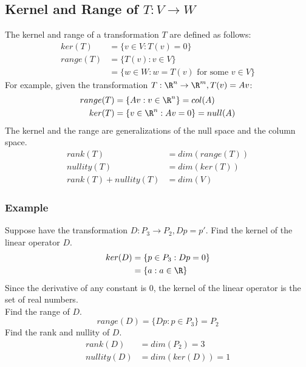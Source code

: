 \documentclass{math}
\begin{document}
\subsection*{Kernel and Range of \( T:V\to W \)}
The kernel and range of a transformation \( T \) are defined as follows:
\begin{align*}
  ker(T) &= \{v\in V: T(v) = 0\} \\
  range(T) &= \{T(v):v\in V\} \\
  &= \{w\in W: w = T(v)\text{ for some }v\in V\}
\end{align*}
For example, given the transformation \( T:\R^n\to\R^m, T(v) = Av \):
\begin{align*}
  range(T) &= \{Av: v\in\R^n\} = col(A) \\
  ker(T) &= \{v\in\R^n: Av = 0\} = null(A)
\end{align*}
The kernel and the range are generalizations of the null space and the column
space.
\begin{align*}
  rank(T) &= dim(range(T)) \\
  nullity(T) &= dim(ker(T)) \\
  rank(T)+nullity(T) &= dim(V)
\end{align*}

\subsubsection*{Example}
Suppose have the transformation \( D:P_3\to P_2, Dp = p' \). Find the kernel
of the linear operator \( D \).
\begin{align*}
  ker(D) &= \{p\in P_3: Dp = 0 \} \\
  &= \{a:a\in\R\}
\end{align*}
Since the derivative of any constant is 0, the kernel of the linear operator is
the set of real numbers. \\
Find the range of \( D \).
\[ range(D) = \{Dp:p\in P_3\} = P_2 \]
Find the rank and nullity of \( D \).
\begin{align*}
  rank(D) &= dim(P_2) = 3 \\
  nullity(D) &= dim(ker(D)) = 1
\end{align*}
\end{document}

